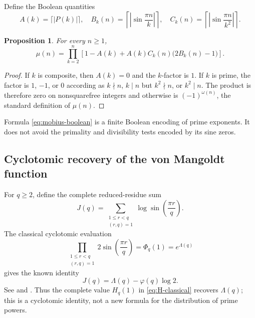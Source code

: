\documentclass[11pt]{amsart}
\numberwithin{equation}{section}
\newtheorem{proposition}[theorem]{Proposition}
\theoremstyle{definition}
\theoremstyle{remark}
\begin{document}
Define the Boolean quantities
\begin{equation}\label{eq:ABC}
 A(k)=\lceil|P(k)|\rceil,
 \quad
 B_k(n)=\left\lceil\left|\sin\frac{\pi n}{k}\right|\right\rceil,
 \quad
 C_k(n)=\left\lceil\left|\sin\frac{\pi n}{k^2}\right|\right\rceil.
\end{equation}

\begin{proposition}\label{prop:mobius-boolean}
For every \(n\geq1\),
\begin{equation}\label{eq:mobius-boolean}
 \mu(n)=\prod_{k=2}^{n}
 \left[1-A(k)+A(k)C_k(n)\bigl(2B_k(n)-1\bigr)\right].
\end{equation}
\end{proposition}

\begin{proof}
If \(k\) is composite, then \(A(k)=0\) and the \(k\)-factor is \(1\).
If \(k\) is prime, the factor is \(1\), \(-1\), or \(0\) according as
\(k\nmid n\), \(k\mid n\) but \(k^2\nmid n\), or \(k^2\mid n\).
The product is therefore zero on nonsquarefree integers and otherwise is
\((-1)^{\omega(n)}\), the standard definition of \(\mu(n)\).
\end{proof}

Formula \eqref{eq:mobius-boolean} is a finite Boolean encoding of prime
exponents.  It does not avoid the primality and divisibility tests encoded
by its sine zeros.

\subsection{Cyclotomic recovery of the von Mangoldt function}

For \(q\geq2\), define the complete reduced-residue sum
\begin{equation}\label{eq:J}
 J(q)=\sum_{\substack{1\leq r<q\\(r,q)=1}}
 \log\sin\!\left(\frac{\pi r}{q}\right).
\end{equation}
The classical cyclotomic evaluation
\begin{equation}\label{eq:cyclotomic-Lambda}
 \prod_{\substack{1\leq r<q\\(r,q)=1}}
 2\sin\!\left(\frac{\pi r}{q}\right)
 =\Phi_q(1)=e^{\Lambda(q)}
\end{equation}
gives the known identity
\begin{equation}\label{eq:J-Lambda}
 J(q)=\Lambda(q)-\varphi(q)\log2.
\end{equation}
See \cite[Lemma~2.2]{HerreraMoree2018} and
\cite[Chapters~1--2]{Washington1997}.  Thus the complete value
\(H_q(1)\) in \eqref{eq:H-classical} recovers \(\Lambda(q)\); this is a
cyclotomic identity, not a new formula for the distribution of prime
powers.
\end{document}
